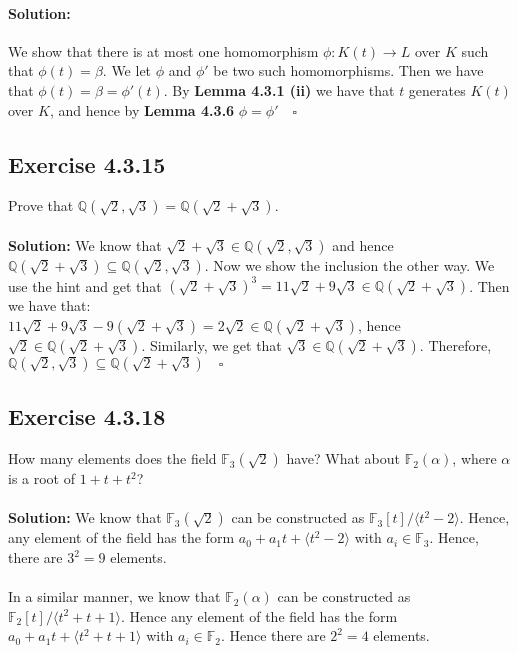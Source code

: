 \documentclass{article}
\begin{document}
\paragraph{Solution:}
We show that there is at most one homomorphism $\phi: K(t) \rightarrow L$ over $K$ such that $\phi(t)= \beta$.
We let $\phi$ and $\phi'$ be two such homomorphisms. Then we have that $\phi(t) = \beta = \phi'(t)$. By \textbf{Lemma 4.3.1 (ii)}
we have that $t$ generates $K(t)$ over $K$, and hence by \textbf{Lemma 4.3.6} $\phi = \phi' \quad \square$


\subsection*{Exercise 4.3.15}
Prove that $\mathbb{Q}(\sqrt 2, \sqrt 3) = \mathbb{Q}(\sqrt 2 + \sqrt 3)$.
\\\\
\textbf{Solution:}
We know that $\sqrt2 + \sqrt3 \in \mathbb{Q}(\sqrt2, \sqrt3)$ and hence $\mathbb{Q}(\sqrt2 + \sqrt3) \subseteq \mathbb{Q}(\sqrt2 , \sqrt3)$. Now we show the inclusion the other way.
We use the hint and get that $(\sqrt2 + \sqrt3)^3 = 11\sqrt2 + 9\sqrt3 \in \mathbb{Q}(\sqrt2+ \sqrt3)$. Then we have that:\\ $11\sqrt2 + 9\sqrt3 - 9(\sqrt2 + \sqrt3 ) = 2\sqrt2 \in \mathbb{Q}(\sqrt2 + \sqrt3)$, 
hence $\sqrt2 \in \mathbb{Q}(\sqrt2 + \sqrt3)$. Similarly, we get that $\sqrt3 \in \mathbb{Q}(\sqrt2 + \sqrt3)$. Therefore, $\mathbb{Q}(\sqrt2, \sqrt3) \subseteq \mathbb{Q}(\sqrt2 + \sqrt3) \quad \square$


\subsection*{Exercise 4.3.18}
How many elements does the field $\mathbb{F}_3(\sqrt 2)$ have? What about $\mathbb{F}_2(\alpha)$, where $\alpha$ is a root of $1+t+t^2$?
\\\\
\textbf{Solution:}
We know that $\mathbb{F}_3(\sqrt 2)$ can be constructed as $\mathbb{F}_3[t]/\langle t^2 - 2 \rangle$. Hence, any element of the field has the form
$a_0 + a_1t + \langle t^2 - 2\rangle$ with $a_i \in \mathbb{F}_3$. Hence, there are $3^2 = 9$ elements.
\\\\
In a similar manner, we know that $\mathbb{F}_2(\alpha)$ can be constructed as $\mathbb{F}_2[t]/\langle t^2+t+1 \rangle$. Hence any element of the field has the form
$a_0 + a_1t + \langle t^2+t+1\rangle$ with $a_i \in \mathbb{F}_2$. Hence there are $2^2 = 4$ elements.
\end{document}
